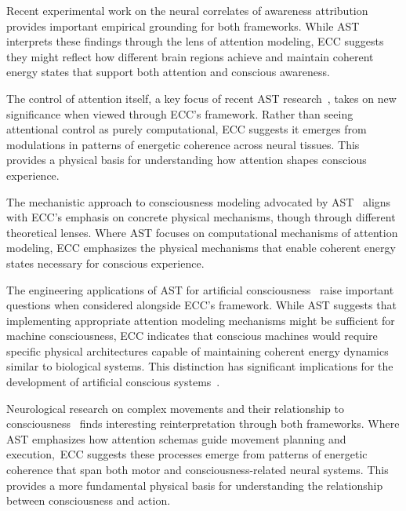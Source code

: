 Recent experimental work on the neural correlates of awareness attribution~\cite{Webb2016, WebbKemper2020} provides important empirical grounding for both frameworks. While AST interprets these findings through the lens of attention modeling, ECC suggests they might reflect how different brain regions achieve and maintain coherent energy states that support both attention and conscious awareness.

The control of attention itself, a key focus of recent AST research~\cite{WebbKemper2020, Graziano2017}, takes on new significance when viewed through ECC's framework. Rather than seeing attentional control as purely computational, ECC suggests it emerges from modulations in patterns of energetic coherence across neural tissues. This provides a physical basis for understanding how attention shapes conscious experience.

The mechanistic approach to consciousness modeling advocated by AST~\cite{Kelly2016, Graziano2019} aligns with ECC's emphasis on concrete physical mechanisms, though through different theoretical lenses. Where AST focuses on computational mechanisms of attention modeling, ECC emphasizes the physical mechanisms that enable coherent energy states necessary for conscious experience.

The engineering applications of AST for artificial consciousness~\cite{Graziano2017, butlin2023consciousnessartificialintelligenceinsights} raise important questions when considered alongside ECC's framework. While AST suggests that implementing appropriate attention modeling mechanisms might be sufficient for machine consciousness, ECC indicates that conscious machines would require specific physical architectures capable of maintaining coherent energy dynamics similar to biological systems. This distinction has significant implications for the development of artificial conscious systems~\cite{seth2024conscious}.

Neurological research on complex movements and their relationship to consciousness~\cite{Graziano2002, Dehaene2014} finds interesting reinterpretation through both frameworks. Where AST emphasizes how attention schemas guide movement planning and execution,~ECC suggests these processes emerge from patterns of energetic coherence that span both motor and consciousness-related neural systems. This provides a more fundamental physical basis for understanding the relationship between consciousness and action.

